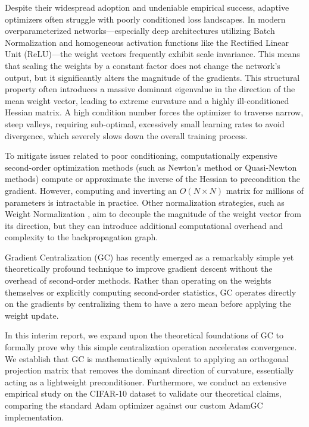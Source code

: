 \documentclass[conference]{IEEEtran}
\begin{document}
Despite their widespread adoption and undeniable empirical success, adaptive optimizers often struggle with poorly conditioned loss landscapes. In modern overparameterized networks—especially deep architectures utilizing Batch Normalization \cite{ioffe2015batch} and homogeneous activation functions like the Rectified Linear Unit (ReLU)—the weight vectors frequently exhibit scale invariance. This means that scaling the weights by a constant factor does not change the network's output, but it significantly alters the magnitude of the gradients. This structural property often introduces a massive dominant eigenvalue in the direction of the mean weight vector, leading to extreme curvature and a highly ill-conditioned Hessian matrix. A high condition number forces the optimizer to traverse narrow, steep valleys, requiring sub-optimal, excessively small learning rates to avoid divergence, which severely slows down the overall training process.

To mitigate issues related to poor conditioning, computationally expensive second-order optimization methods (such as Newton's method or Quasi-Newton methods) compute or approximate the inverse of the Hessian to precondition the gradient. However, computing and inverting an $O(N \times N)$ matrix for millions of parameters is intractable in practice. Other normalization strategies, such as Weight Normalization \cite{salimans2016weight}, aim to decouple the magnitude of the weight vector from its direction, but they can introduce additional computational overhead and complexity to the backpropagation graph.

Gradient Centralization (GC) \cite{yong2020gradient} has recently emerged as a remarkably simple yet theoretically profound technique to improve gradient descent without the overhead of second-order methods. Rather than operating on the weights themselves or explicitly computing second-order statistics, GC operates directly on the gradients by centralizing them to have a zero mean before applying the weight update. 

In this interim report, we expand upon the theoretical foundations of GC to formally prove why this simple centralization operation accelerates convergence. We establish that GC is mathematically equivalent to applying an orthogonal projection matrix that removes the dominant direction of curvature, essentially acting as a lightweight preconditioner. Furthermore, we conduct an extensive empirical study on the CIFAR-10 dataset to validate our theoretical claims, comparing the standard Adam optimizer against our custom AdamGC implementation.
\end{document}
